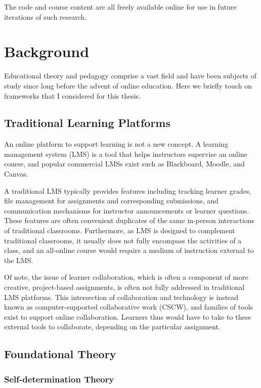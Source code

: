 \documentclass[12pt,twoside]{mitthesis}
\begin{document}
The code and course content are all freely available online for use in future iterations of such research.~\cite{rla}

\chapter{Background}

Educational theory and pedagogy comprise a vast field and have been subjects of study since long before the advent of online education. Here we briefly touch on frameworks that I considered for this thesis. 

\section{Traditional Learning Platforms}

An online platform to support learning is not a new concept. A learning management system (LMS) is a tool that helps instructors supervise an online course, and popular commercial LMSs exist such as Blackboard, Moodle, and Canvas. 

A traditional LMS typically provides features including tracking learner grades, file management for assignments and corresponding submissions, and communication mechanisms for instructor announcements or learner questions. These features are often convenient duplicates of the same in-person interactions of traditional classrooms. Furthermore, as LMS is designed to complement traditional classrooms, it usually does not fully encompass the activities of a class, and an all-online course would require a medium of instruction external to the LMS.~\cite{zagalsky2015emergence}

Of note, the issue of learner collaboration, which is often a component of more creative, project-based assignments, is often not fully addressed in traditional LMS platforms. This intersection of collaboration and technology is instead known as computer-supported collaborative work (CSCW), and families of tools exist to support online collaboration. Learners thus would have to take to these external tools to collaborate, depending on the particular assignment.

\section{Foundational Theory}

\subsection{Self-determination Theory}
\end{document}
